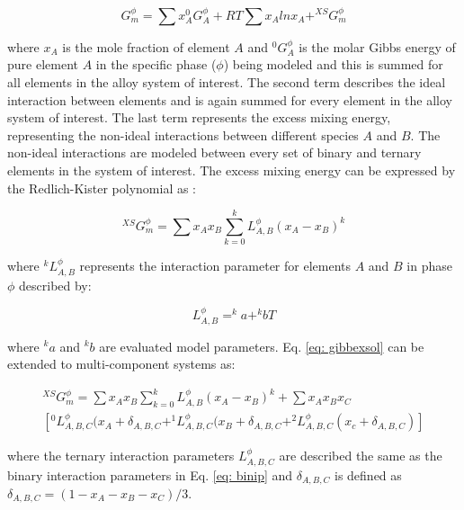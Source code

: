 \begin{equation}
\label{eq: gibbssolution}
G_m^{\phi} = \sum x_{A} ^{0}G_{A}^{\phi} + R T \sum x_{A} ln x_{A} + ^{XS}G_{m}^{\phi}
\end{equation}

\noindent where $x_{A}$ is the mole fraction of element $A$ and $^{0}G_{A}^{\phi}$ is the molar Gibbs energy of pure element $A$ in the specific phase ($\phi$) being modeled and this is summed for all elements in the alloy system of interest. The second term describes the ideal interaction between elements and is again summed for every element in the alloy system of interest. The last term represents the excess mixing energy, representing the non-ideal interactions between different species $A$ and $B$. The non-ideal interactions are modeled between every set of binary and ternary elements in the system of interest. The excess mixing energy can be expressed by the Redlich-Kister polynomial as \cite{Redlich1948b}: 

\begin{equation}
\label{eq: gibbexsol}
^{XS}G_m^{\phi} = \sum x_{A} x_{B} \sum_{k=0} ^{k}L_{A,B}^{\phi} (x_{A} - x_{B})^k
\end{equation}

\noindent where $^kL_{A,B}^{\phi}$ represents the interaction parameter for elements $A$ and $B$ in phase $\phi$ described by:

\begin{equation}
\label{eq: binip}
L_{A,B}^{\phi} = ^{k}a + ^{k}bT
\end{equation}

\noindent where $^{k}a$ and $^{k}b$ are evaluated model parameters. Eq. \ref{eq: gibbexsol} can be extended to multi-component systems as:

\begin{multline}
\label{eq: gibbexsolmulti}
^{XS}G_m^{\phi} = \sum x_{A} x_{B} \sum_{k=0} ^{k}L_{A,B}^{\phi} (x_{A} - x_{B})^k + \sum x_{A} x_{B} x_{C} \\ \left[ ^{0}L_{A, B, C}^{\phi} (x_{A} + \delta_{A, B, C} + ^{1}L_{A, B, C}^{\phi} (x_{B} + \delta_{A, B, C} + ^{2}L_{A, B, C}^{\phi} (x_{c} + \delta_{A, B, C} ) \right]
\end{multline}

\noindent where the ternary interaction parameters $L_{A, B, C}^{\phi}$ are described the same as the binary interaction parameters in Eq. \ref{eq: binip} and $\delta_{A, B, C}$ is defined as $\delta_{A, B, C} = ( 1 - x_{A} - x_{B} - x_{C})/3$.

